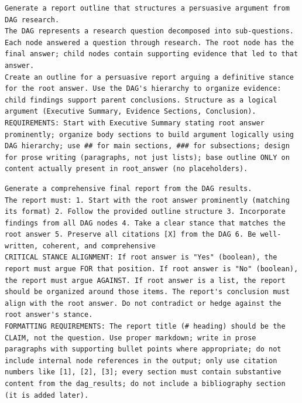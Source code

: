 \begin{lstlisting}[title={OutlineFromDAGSignature (Phase 3)}]
Generate a report outline that structures a persuasive argument from DAG research.
The DAG represents a research question decomposed into sub-questions. Each node answered a question through research. The root node has the final answer; child nodes contain supporting evidence that led to that answer.
Create an outline for a persuasive report arguing a definitive stance for the root answer. Use the DAG's hierarchy to organize evidence: child findings support parent conclusions. Structure as a logical argument (Executive Summary, Evidence Sections, Conclusion).
REQUIREMENTS: Start with Executive Summary stating root answer prominently; organize body sections to build argument logically using DAG hierarchy; use ## for main sections, ### for subsections; design for prose writing (paragraphs, not just lists); base outline ONLY on content actually present in root_answer (no placeholders).
\end{lstlisting}

\begin{lstlisting}[title={ReportFromDAGSignature (Phase 3)}]
Generate a comprehensive final report from the DAG results.
The report must: 1. Start with the root answer prominently (matching its format) 2. Follow the provided outline structure 3. Incorporate findings from all DAG nodes 4. Take a clear stance that matches the root answer 5. Preserve all citations [X] from the DAG 6. Be well-written, coherent, and comprehensive
CRITICAL STANCE ALIGNMENT: If root answer is "Yes" (boolean), the report must argue FOR that position. If root answer is "No" (boolean), the report must argue AGAINST. If root answer is a list, the report should be organized around those items. The report's conclusion must align with the root answer. Do not contradict or hedge against the root answer's stance.
FORMATTING REQUIREMENTS: The report title (# heading) should be the CLAIM, not the question. Use proper markdown; write in prose paragraphs with supporting bullet points where appropriate; do not include internal node references in the output; only use citation numbers like [1], [2], [3]; every section must contain substantive content from the dag_results; do not include a bibliography section (it is added later).
\end{lstlisting}

